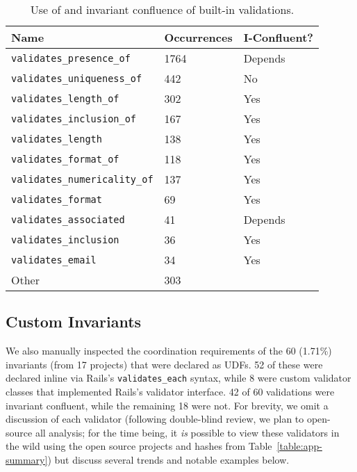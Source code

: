 \begin{table}
\begin{center}
\small
\begin{tabular}{|l l l |}
\hline
Name & Occurrences & I-Confluent?\\\hline
\texttt{validates\_presence\_of} & 1764 & Depends\\
\texttt{validates\_uniqueness\_of} & 442 & No \\
\texttt{validates\_length\_of} & 302 & Yes \\
\texttt{validates\_inclusion\_of} & 167 & Yes\\
\texttt{validates\_length} & 138 & Yes \\
\texttt{validates\_format\_of} & 118 & Yes\\
\texttt{validates\_numericality\_of} & 137 & Yes \\
\texttt{validates\_format} & 69 & Yes \\
\texttt{validates\_associated} & 41 & Depends\\
\texttt{validates\_inclusion} & 36 & Yes \\
\texttt{validates\_email} & 34 & Yes \\
Other & 303 & \\\hline
\end{tabular}
\end{center}\vspace{-1em}
\caption{Use of and invariant confluence of built-in validations.}
\label{table:builtins}
\end{table}

\subsection{Custom Invariants}

We also manually inspected the coordination requirements of the 60
(1.71\%) invariants (from 17 projects) that were declared as UDFs. 52
of these were declared inline via Rails's \texttt{validates\_each}
syntax, while 8 were custom validator classes that implemented Rails's
validator interface. 42 of 60 validations were invariant confluent,
while the remaining 18 were not. For brevity, we omit a discussion of
each validator (following double-blind review, we plan to open-source
all analysis; for the time being, it \textit{is} possible to view
these validators in the wild using the open source projects and hashes
from Table~\ref{table:app-summary}) but discuss several trends and
notable examples below.

